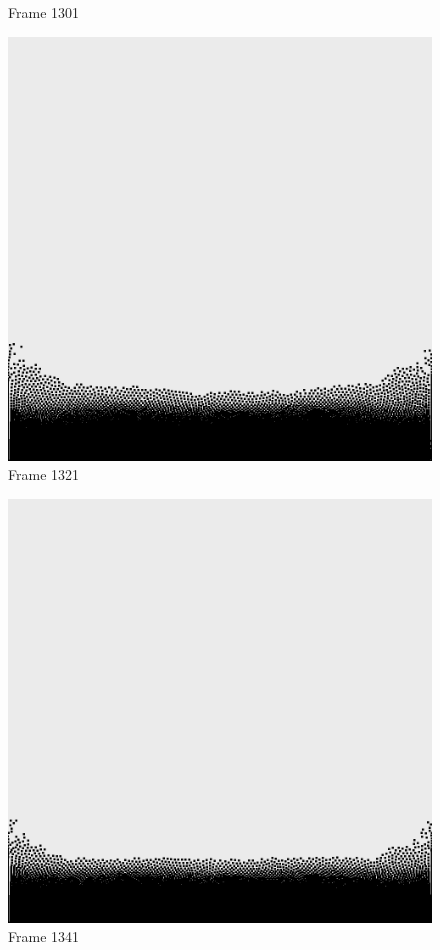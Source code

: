 \documentclass[a4paper, 12pt, oneside]{book}
\begin{document}
\begin{figure}[!ht]
\begin{center}
            Frame 1301
        \end{center}
    \endminipage
    \hfill
        \begin{center}
            \includegraphics[width=\linewidth]{images/test_case_1/1321.png}
            Frame 1321
        \end{center}
    \endminipage
    \hfill
        \begin{center}
            \includegraphics[width=\linewidth]{images/test_case_1/1341.png}
            Frame 1341
        \end{center}
    \endminipage
    \hfill


\end{figure}
\end{document}

